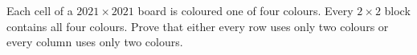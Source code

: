 Each cell of a $2021\times2021$ board is coloured one of four colours. Every $2\times2$ block contains all four colours. Prove that either every row uses only two colours or every column uses only two colours.
